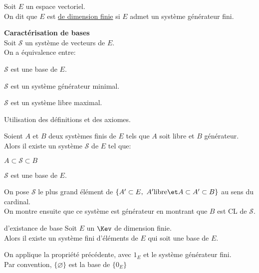 \documentclass[12pt,twoside,a4paper]{article}
\author{MPSI 2}
\begin{document}
	\maketitle
	\begin{defi}
		Soit $E$ un espace vectoriel.\\
		On dit que $E$ est \underline{de dimension finie} si $E$ admet un syst\`eme g\'en\'erateur fini.
	\end{defi}
	\begin{prop}
		\textbf{Caract\'erisation de bases}\\
		Soit $\mathcal{S}$ un syst\`eme de vecteurs de $E$.\\
		On a \'equivalence entre:
		\begin{liste}
			\item $\mathcal{S}$ est une base de $E$.
			\item $\mathcal{S}$ est un syst\`eme g\'en\'erateur minimal.
			\item $\mathcal{S}$ est un syst\`eme libre maximal.
		\end{liste}
	\end{prop}
	\begin{preuve}
		Utilisation des d\'efinitions et des axiomes.
	\end{preuve}
	\begin{prop}
		Soient $A$ et $B$ deux syst\`emes finis de $E$ tels que $A$ soit libre et $B$ g\'en\'erateur.\\ 
		Alors il existe un syst\`eme $\mathcal{S}$ de $E$ tel que:
		\begin{liste}
			\item $A\subset\mathcal{S}\subset B$
			\item $\mathcal{S}$ est une base de $E$.
		\end{liste}
	\end{prop}
	\begin{preuve}
		On pose $\mathcal{S}$ le plus grand \'el\'ement de $\{A'\subset E,\ A' \mathrm{ libre}\et A\subset A'\subset B \}$ au sens du cardinal.\\
		On montre ensuite que ce syst\`eme est g\'en\'erateur en montrant que $B$ est CL de $\mathcal{S}$.
	\end{preuve}
	\begin{theo}{d'existance de base}
		Soit $E$ un $\Kev$ de dimension finie.\\
		Alors il existe un syst\`eme fini d'\'el\'ements de $E$ qui soit une base de $E$.
	\end{theo}
	\begin{preuve}
		On applique la propri\'et\'e pr\'ec\'edente, avec $1_E$ et le syst\`eme g\'en\'erateur fini.\\
		Par convention, $\{\varnothing\}$ est la base de $\{0_E\}$
	\end{preuve}
\end{document}
